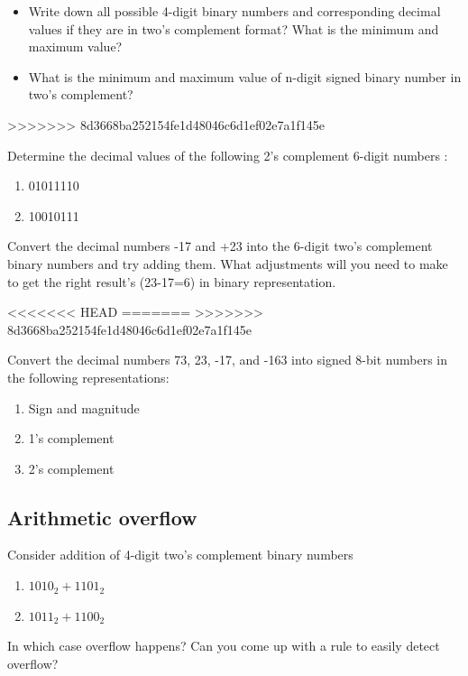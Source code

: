 \begin{prob}
  \begin{itemize}
  \item Write down all possible 4-digit binary numbers and corresponding decimal
    values if they are in two's complement format? What is the minimum and maximum value?
  \item What is the minimum and maximum value of n-digit signed binary number in
    two's complement?
  \end{itemize}
\end{prob}
>>>>>>> 8d3668ba252154fe1d48046c6d1ef02e7a1f145e
\vspace{20em}

\begin{prob}
  Determine the decimal values of the following 2’s complement 6-digit numbers :
  \begin{enumerate}
  \item 01011110
  \item 10010111
  \end{enumerate}
\end{prob}
\vspace{10em}

\begin{prob}
  Convert the decimal numbers -17 and +23 into the 6-digit two's complement binary numbers and try adding them. What adjustments will you need to make to get the right result's (23-17=6) in binary representation.
\end{prob}
<<<<<<< HEAD
\vspace{20em}
=======
\vspace{10em}
>>>>>>> 8d3668ba252154fe1d48046c6d1ef02e7a1f145e

\begin{prob}
  Convert the decimal numbers 73, 23, -17, and -163 into signed 8-bit numbers in the
  following representations:
  \begin{enumerate}
    \item Sign and magnitude
    \item 1’s complement
    \item 2’s complement
  \end{enumerate}
\end{prob}
\vspace{20em}


\subsection{Arithmetic overflow}
\begin{prob}
  Consider addition of 4-digit two's complement binary numbers
  \begin{enumerate}
  \item $1010_2 + 1101_2$
  \item $1011_2 + 1100_2$
  \end{enumerate}
  In which case overflow happens? Can you come up with a rule to easily detect overflow?
\end{prob}
\vspace{20em}

